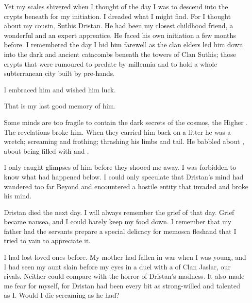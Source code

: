 \documentclass
  [a4paper,
   12pt,
   oneside
  ]%
  {article}
\begin{document}
Yet my scales shivered when I thought of the day I was to descend into the crypts beneath \Yormis for my initiation. 
I dreaded what I might find.
For I thought about my cousin, Suthis Dristan. 
He had been my closest childhood friend, a wonderful \scatha and an expert apprentice. 
He faced his own initiation a few months before. 
I remembered the day I bid him farewell as the clan elders led him down into the dark and ancient catacombs beneath the towers of Clan Suthis; those crypts that were rumoured to predate \Yormis by millennia and to hold a whole subterranean city built by pre-\scathaese hands. 

I embraced him and wished him luck. 

That is my last good memory of him. 

Some minds are too fragile to contain the dark secrets of the cosmos, the Higher \Arcana.
The revelations broke him.  
When they carried him back on a litter he was a wretch; screaming and frothing; thrashing his limbs and tail. 
He babbled about , about being filled with  and .


I only caught glimpses of him before they shooed me away. 
I was forbidden to know what had happened below. 
I could only speculate that Dristan's mind had wandered too far Beyond and encountered a hostile entity that invaded and broke his mind. 

Dristan died the next day. 
I will always remember the grief of that day. 
Grief became nausea, and I could barely keep my food down. 
I remember that my father had the servants prepare a special delicacy for me\dash mosca flesh\dash and that I tried to vain to appreciate it. 

I had lost loved ones before.
My mother had fallen in war when I was young, and I had seen my aunt slain before my eyes in a duel with a \scatha of Clan Jaslar, our rivals. 
Neither could compare with the horror of Dristan's madness. 
It also made me fear for myself, for Dristan had been every bit as strong-willed and talented as I. 
Would I die screaming as he had?
\end{document}
